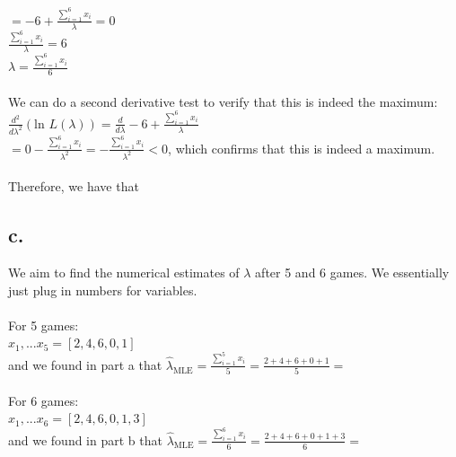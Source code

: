 \documentclass{article}
\newcommand{\1}{\mathbf{1}}
\begin{document}
{$= -6 + \frac{\sum_{i=1}^{6} x_i}{\lambda} = 0$ \\
$\frac{\sum_{i=1}^{6} x_i}{\lambda} = 6$ \\
$\lambda = \frac{\sum_{i=1}^{6} x_i}{6}$ \\ \\
We can do a second derivative test to verify that this is indeed the maximum: \\ 
$\frac{d^2}{d\lambda^2} (\text{ln } L(\lambda)) = \frac{d}{d\lambda} -6 + \frac{\sum_{i=1}^{6} x_i}{\lambda}$ \\
$= 0 - \frac{\sum_{i=1}^{6} x_i}{\lambda^2} = - \frac{\sum_{i=1}^{6} x_i}{\lambda^2} < 0$, which confirms that this is indeed a maximum. \\ \\
Therefore, we have that 

\subsection*{c.}
We aim to find the numerical estimates of $\lambda$ after 5 and 6 games. We essentially just plug in numbers for variables. \\ \\
For 5 games: \\
$x_1, ... x_5 = [2, 4, 6, 0, 1]$ \\
and we found in part a that $\widehat{\lambda}_{\text{MLE}} = \frac{\sum_{i=1}^{5} x_i}{5} = \frac{2 + 4 + 6 + 0 + 1}{5} = $  \\ \\
For 6 games: \\
$x_1, ... x_6 = [2, 4, 6, 0, 1, 3]$ \\
and we found in part b that $\widehat{\lambda}_{\text{MLE}} = \frac{\sum_{i=1}^{6} x_i}{6} = \frac{2 + 4 + 6 + 0 + 1 + 3}{6} = $ 

}
\end{document}
